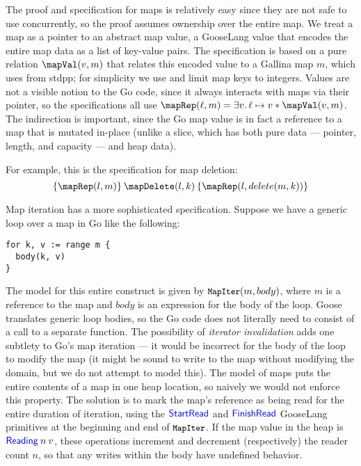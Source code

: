 The proof and specification for maps is relatively easy since they are
not safe to use concurrently, so the proof assumes ownership over the entire map. We
treat a map as a pointer to an abstract map value, a GooseLang value
that encodes the entire map data as a list of key-value pairs. The
specification is based on a pure relation $\mapVal(v, m)$ that relates
this encoded value to a Gallina map $m$, which uses  from
stdpp; for simplicity we use  and limit map
keys to integers. Values are not a visible notion to the Go code, since
it always interacts with maps via their pointer, so the specifications
all use $\mapRep(\ell, m) = \exists v.\, \ell \mapsto v * \mapVal(v, m)$. The
indirection is important, since the Go map value
 is in fact a reference to a map that is
mutated in-place (unlike a slice, which has both pure data --- pointer,
length, and capacity --- and heap data).

For example, this is the specification for map deletion:
\[
\hoare{\mapRep(l, m)}{\mapDelete(l, k)}{\mapRep(l, delete(m, k))}
\]

Map iteration has a more sophisticated specification. Suppose we have a generic loop
over a map in Go like the following:

\begin{verbatim}
for k, v := range m {
  body(k, v)
}
\end{verbatim}

The model for this entire construct is given by $\cc{MapIter}(m, body)$, where
$m$ is a reference to the map and $body$ is an expression for the body of the
loop. Goose translates generic loop bodies, so the Go code does not literally
need to consist of a call to a separate function. The possibility of
\emph{iterator invalidation} adds one subtlety to Go's map iteration --- it
would be incorrect for the body of the loop to modify the map (it might be sound
to write to the map without modifying the domain, but we do not attempt to model
this). The model of maps puts the entire contents of a map in one heap location,
so naively we would not enforce this property. The solution is to mark the map's
reference as being read for the entire duration of iteration, using the
$\mathsf{\textcolor{blue}{StartRead}}$ and $\mathsf{\textcolor{blue}{FinishRead}}$ GooseLang primitives at the
beginning and end of $\cc{MapIter}$. If the map value in the heap is
$\mathsf{\textcolor{blue}{Reading}} \: n \: v$, these operations increment and decrement
(respectively) the reader count $n$, so that any writes within the body have
undefined behavior.

